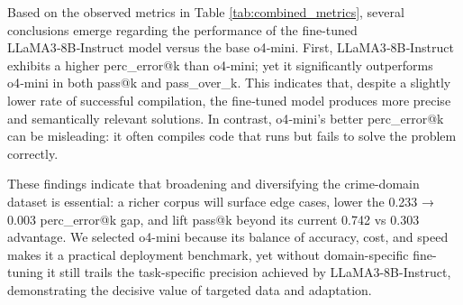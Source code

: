 Based on the observed metrics in Table \ref{tab:combined_metrics}, several conclusions emerge regarding the performance of the fine-tuned LLaMA3‑8B‑Instruct model versus the base o4‑mini. First, LLaMA3‑8B‑Instruct exhibits a higher perc\_error@k than o4‑mini; yet it significantly outperforms o4‑mini in both pass@k and pass\_over\_k. This indicates that, despite a slightly lower rate of successful compilation, the fine‑tuned model produces more precise and semantically relevant solutions. In contrast, o4‑mini's better perc\_error@k can be misleading: it often compiles code that runs but fails to solve the problem correctly.

These findings indicate that broadening and diversifying the crime-domain dataset is essential: a richer corpus will surface edge cases, lower the 0.233 → 0.003 perc\_error@k gap, and lift pass@k beyond its current 0.742 vs 0.303 advantage. We selected o4-mini because its balance of accuracy, cost, and speed makes it a practical deployment benchmark, yet without domain-specific fine-tuning it still trails the task-specific precision achieved by LLaMA3-8B-Instruct, demonstrating the decisive value of targeted data and adaptation.




